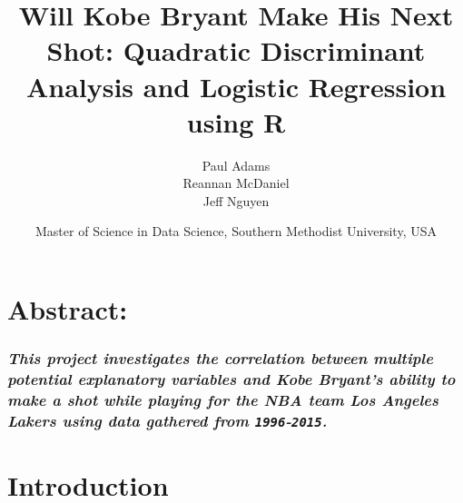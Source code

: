 \documentclass[american,]{article}
\title{Will Kobe Bryant Make His Next Shot: Quadratic Discriminant Analysis and Logistic Regression using R}
\author{Paul Adams \\ Reannan McDaniel \\ Jeff Nguyen}
\date{Master of Science in Data Science, Southern Methodist University, USA}
\begin{document}
\maketitle

{
\setcounter{tocdepth}{2}
\tableofcontents
}
\hypertarget{abstract}{%
\section{\texorpdfstring{\textbf{Abstract:}}{Abstract:}}\label{abstract}}

\hypertarget{this-project-investigates-the-correlation-between-multiple-potential-explanatory-variables-and-kobe-bryants-ability-to-make-a-shot-while-playing-for-the-nba-team-los-angeles-lakers-using-data-gathered-from-1996-2015.}{%
\subsubsection{\texorpdfstring{\emph{This project investigates the correlation between multiple potential explanatory variables and Kobe Bryant's ability to make a shot while playing for the NBA team Los Angeles Lakers using data gathered from \texttt{1996}-\texttt{2015}.}}{This project investigates the correlation between multiple potential explanatory variables and Kobe Bryant's ability to make a shot while playing for the NBA team Los Angeles Lakers using data gathered from 1996-2015.}}\label{this-project-investigates-the-correlation-between-multiple-potential-explanatory-variables-and-kobe-bryants-ability-to-make-a-shot-while-playing-for-the-nba-team-los-angeles-lakers-using-data-gathered-from-1996-2015.}}

\hypertarget{introduction}{%
\section{\texorpdfstring{\textbf{Introduction}}{Introduction}}\label{introduction}}
\end{document}
